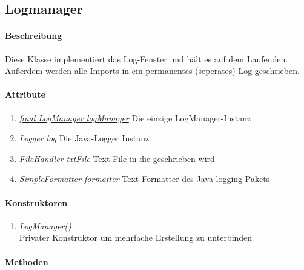 \subsection{Logmanager}

\paragraph{Beschreibung}
Diese Klasse implementiert das Log-Fenster und hält es auf dem Laufenden.
Außerdem werden alle Imports in ein permanentes (seperates) Log geschrieben.

\paragraph{Attribute}
\begin{enumerate}[$\bullet$]
	\item \underline{\textit{final LogManager logManager}}  Die einzige LogManager-Instanz
	\item \textit{Logger log} Die Java-Logger Instanz
	\item \textit{FileHandler txtFile} Text-File in die geschrieben wird
	\item \textit{SimpleFormatter formatter} Text-Formatter des Java logging Pakets
\end{enumerate}

\paragraph{Konstruktoren}
\begin{enumerate}[-]
	\item \textit{LogManager()} \\
	Privater Konstruktor um mehrfache Erstellung zu unterbinden
\end{enumerate}


\paragraph{Methoden}

